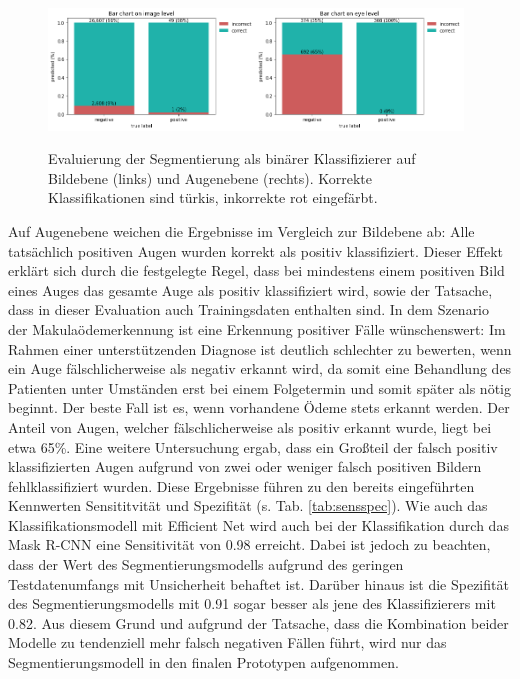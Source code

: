 \begin{figure}[ht!]
\centering
\includegraphics[width=0.49\textwidth]{./pic/Segmentierung/barchart_image.png}\includegraphics[width=0.49\textwidth]{./pic/Segmentierung/barchart_eye.png}
\caption{\label{fig:barchart_imgeye} Evaluierung der Segmentierung als binärer Klassifizierer auf Bildebene (links) und Augenebene (rechts). Korrekte Klassifikationen sind türkis, inkorrekte rot eingefärbt.}
\end{figure}
Auf Augenebene weichen die Ergebnisse im Vergleich zur Bildebene ab: Alle tatsächlich positiven Augen wurden korrekt als positiv klassifiziert. Dieser Effekt erklärt sich durch die festgelegte Regel, dass bei mindestens einem positiven Bild eines Auges das gesamte Auge als positiv klassifiziert wird, sowie der Tatsache, dass in dieser Evaluation auch Trainingsdaten enthalten sind. 
In dem Szenario der Makulaödemerkennung ist eine Erkennung positiver Fälle wünschenswert: Im Rahmen einer unterstützenden Diagnose ist deutlich schlechter zu bewerten, wenn ein Auge fälschlicherweise als negativ erkannt wird, da somit eine Behandlung des Patienten unter Umständen erst bei einem Folgetermin und somit später als nötig beginnt. Der beste Fall ist es, wenn vorhandene Ödeme stets erkannt werden. Der Anteil von Augen, welcher fälschlicherweise als positiv erkannt wurde, liegt bei etwa 65\%. Eine weitere Untersuchung ergab, dass ein Großteil der falsch positiv klassifizierten Augen aufgrund von zwei oder weniger falsch positiven Bildern fehlklassifiziert wurden.\newline
Diese Ergebnisse führen zu den bereits eingeführten Kennwerten Sensititvität und Spezifität (s. Tab. \ref{tab:sensspec}). Wie auch das Klassifikationsmodell mit Efficient Net wird auch bei der Klassifikation durch das Mask R-CNN eine Sensitivität von 0.98 erreicht. Dabei ist jedoch zu beachten, dass der Wert des Segmentierungsmodells aufgrund des geringen Testdatenumfangs mit Unsicherheit behaftet ist. Darüber hinaus ist die Spezifität des Segmentierungsmodells mit 0.91 sogar besser als jene des Klassifizierers mit 0.82. Aus diesem Grund und aufgrund der Tatsache, dass die Kombination beider Modelle zu tendenziell mehr falsch negativen Fällen führt, wird nur das Segmentierungsmodell in den finalen Prototypen aufgenommen.
